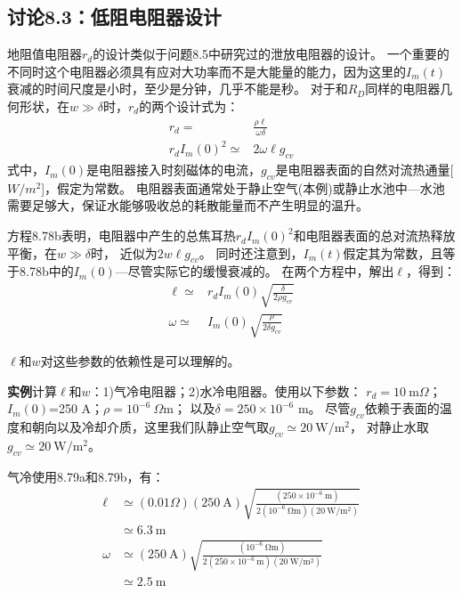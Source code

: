 \subsection{讨论8.3：低阻电阻器设计}
地阻值电阻器$r_d$的设计类似于问题8.5中研究过的泄放电阻器的设计。
一个重要的不同时这个电阻器必须具有应对大功率而不是大能量的能力，因为这里的$I_m(t)$
衰减的时间尺度是小时，至少是分钟，几乎不能是秒。
对于和$R_D$同样的电阻器几何形状，在$w\gg \delta$时，$r_d$的两个设计式为：
\begin{subequations}
	\begin{align}
r_d=&\frac{\rho\ell}{\omega\delta}\\
r_dI_m(0)^2\simeq& 2\omega\ell g_{cv}
	\end{align}
\end{subequations}
式中，$I_m(0)$是电阻器接入时刻磁体的电流，$g_{cv}$是电阻器表面的自然对流热通量[$W/m^2$]，假定为常数。
电阻器表面通常处于静止空气(本例)或静止水池中---水池需要足够大，保证水能够吸收总的耗散能量而不产生明显的温升。

方程8.78b表明，电阻器中产生的总焦耳热$r_d I_m(0)^2$和电阻器表面的总对流热释放平衡，在$w\gg \delta$时，
近似为$2w\ell g_{cv}$。
同时还注意到，$I_m(t)$假定其为常数，且等于8.78b中的$I_m(0)$---尽管实际它的缓慢衰减的。
在两个方程中，解出$\ell$，得到：
\begin{subequations}
	\begin{align}
\ell\simeq& r_dI_m(0)\sqrt{\frac{\delta}{2\rho g_{cv}}}\\
\omega\simeq& I_m(0)\sqrt{\frac{\rho}{2\delta g_{cv}}}
	\end{align}
\end{subequations}

$\ell$和$w$对这些参数的依赖性是可以理解的。

\textbf{实例}\qquad 计算$\ell$和$w$：1)气冷电阻器；2)水冷电阻器。使用以下参数：
$r_d=10\ \mathrm{m}\Omega$；$I_m(0)$=250 A；$\rho=10^{-6}\ \Omega$m；
以及$\delta=250\times 10^{-6}$ m。
尽管$g_{cv}$依赖于表面的温度和朝向以及冷却介质，这里我们队静止空气取$g_{cv}\simeq 20\ \mathrm{W/m^2}$，
对静止水取$g_{cv}\simeq 20\ \mathrm{W/m^2}$。

气冷\qquad 使用8.79a和8.79b，有：
\begin{align*}%
\ell&\simeq(0.01\Omega)(250\ \mathrm{A})\sqrt{\frac{(250\times 10^{-6}\ \mathrm{m})}{2(10^{-6}\ \mathrm{\Omega m})(20\ \mathrm{W/m^2})}} \\
&\simeq 6.3\ \mathrm{m}\\
\omega&\simeq(250\ \mathrm{A})\sqrt{\frac{(10^{-6}\ \mathrm{\Omega m})}{2(250\times 10^{-6}\ \mathrm{m})(20\ \mathrm{W/m^2})}} \\
&\simeq 2.5\ \mathrm{m}
\end{align*}

